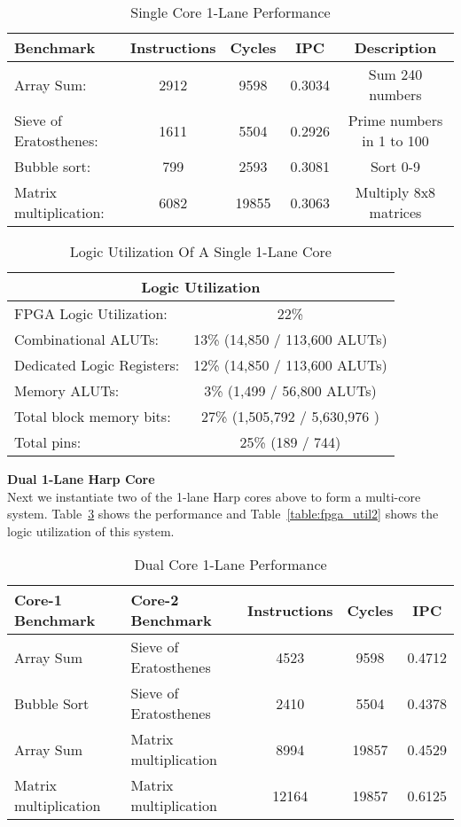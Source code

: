 \begin{table}[!htbp]
  \centering
  \begin{tabular}{|l|c|c|c|c|}
    \hline
Benchmark		&Instructions 	&Cycles		&IPC		&Description\\
    \hline
Array Sum:		&2912		&9598		&0.3034 	&Sum 240 numbers \\
Sieve of Eratosthenes:	&1611		&5504		&0.2926 	&Prime numbers in 1 to 100\\
Bubble sort:		&799		&2593		&0.3081 	&Sort 0-9\\
Matrix multiplication:	&6082		&19855		&0.3063 	&Multiply 8x8 matrices\\
    \hline
  \end{tabular}
  \caption{Single Core 1-Lane Performance}
  \label{table:perf1}
\end{table}

\begin{table}[!htbp]
  \centering
  \begin{tabular}{|l|c|}
    \hline
    \multicolumn{2}{|c|}{Logic Utilization} \\
    \hline
FPGA Logic Utilization:		& 22\% 	\\
   Combinational ALUTs:		& 13\% 	(14,850 / 113,600 ALUTs)\\
   Dedicated Logic Registers:	& 12\% 	(14,850 / 113,600 ALUTs)\\
   Memory ALUTs:		& 3\% 	(1,499 / 56,800 ALUTs)\\
Total block memory bits:	& 27\%  (1,505,792 / 5,630,976 )\\
Total pins:			& 25\% 	(189 / 744)\\
    \hline
  \end{tabular}
  \caption{Logic Utilization Of A Single 1-Lane Core}
  \label{table:fpga_util1}
\end{table}

\noindent\textbf{Dual 1-Lane Harp Core}\\
Next we instantiate two of the 1-lane Harp cores above to form a multi-core system. Table~\ref{table:perf2} shows the performance and Table~\ref{table:fpga_util2} shows the logic utilization of this system.

\begin{table}[!htbp]
  \centering
  \begin{tabular}{|l|l|c|c|c|}
    \hline
Core-1 Benchmark	&Core-2 Benchmark	&Instructions 	&Cycles		&IPC	\\
    \hline
Array Sum   	&Sieve of Eratosthenes 			&4523		&9598		&0.4712	\\
Bubble Sort   	&Sieve of Eratosthenes    			&2410		&5504		&0.4378	\\
Array Sum		&Matrix multiplication		&8994		&19857		&0.4529	\\
Matrix multiplication&Matrix multiplication	&12164		&19857		&0.6125 \\
    \hline
  \end{tabular}
  \caption{Dual Core 1-Lane Performance}
  \label{table:perf2}
\end{table}


